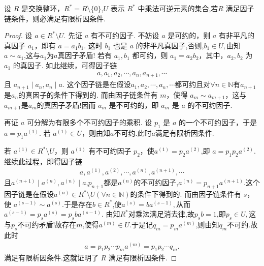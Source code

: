 \documentclass[../../main.tex]{subfiles}%
\begin{document}
\begin{lemma}\label{lemma:抽象代数--引理2.2.3}
设 \( R \) 是交换整环，\( R^* = R \setminus \{0\} \),\( U \) 表示 \( R^* \) 中乘法可逆元素的集合,若\( R \) 满足因子链条件，则必满足有限析因条件.
\end{lemma}
\begin{proof}
设 \( a \in R^* \setminus U \). 先证 \( a \) 有不可约因子. 不妨设 \( a \) 是可约的，则 \( a \) 有非平凡的真因子 \( a_1 \)，即有 \( a = a_1b_1 \). 这时 \( b_1 \) 也是 \( a \) 的非平凡真因子,否则,$b_1\in U,$由知$a\sim a_1$,这与$a_1$为$a$真因子矛盾! 若有 \( a_1, b_1 \) 都可约，则 \( a_1 = a_2b_2 \)，其中，\( a_2, b_2 \) 为 \( a_1 \) 的真因子. 如此继续，可得因子链
\begin{align*}
a, a_1, a_2, \cdots, a_n, a_{n+1}, \cdots
\end{align*}
且 \( a_{n+1} \mid a_n,a_n\mid a\). 
这个因子链是在假设$a_1,a_2,\cdots,a_n,\cdots$都可约且对$\forall n\in \mathbb{N}$有$a_{n+1}$是$a_n$的真因子的条件下得到的.
而由因子链条件有 \( m \)，使得 \( a_m \sim a_{m+1} \)，这与$a_{m+1}$是$a_m$的真因子矛盾!因而 \( a_m \) 是不可约的，即 \( a_m \) 是 \( a \) 的不可约因子.

再证 \( a \) 可分解为有限多个不可约因子的乘积. 设 \( p_1 \) 是 \( a \) 的一个不可约因子，于是 \( a = p_1a^{(1)} \). 若 \( a^{(1)} \in U \)，则由知$a$不可约.此时$a$满足有限析因条件.

若 \( a^{(1)} \in R^* \setminus U \)，则 \( a^{(1)} \) 有不可约因子 \( p_2 \)，使$a^{(1)}=p_2a^{(2)}$,即 \( a = p_1p_2a^{(2)} \). 继续此过程，即得因子链
\begin{align*}
a, a^{(1)}, a^{(2)}, \cdots, a^{(n)}, a^{(n+1)}, \cdots
\end{align*}
且\( a^{(n+1)} \mid a^{(n)},a^{(n)}\mid a\),$p_{n+1}$都是$a^{(n)}$的不可约因子,$a^{(n)}=p_{n+1}a^{(n+1)}$.这个因子链是在假设$a^{(n)}\in R^*\setminus U(\forall n\in \mathbb{N})$的条件下得到的.
而由因子链条件有 \( s \)，使 \( a^{(s-1)} \sim a^{(s)} \).于是存在$b\in R^*$,使$a^{(s)}=ba^{(s-1)},$从而
$a^{\left( s-1 \right)}=p_sa^{\left( s \right)}=p_sba^{\left( s-1 \right)}$.
由知$R^*$对乘法满足消去律,故$p_sb=1$,即$p_s\in U,$这与$p_s$不可约矛盾!故存在$m$,使得$a^{(m)}\in U.$于是记$q_m = p_ma^{(m)}$,则由知$q_m$不可约.故此时
\begin{align*}
a = p_1p_2\cdots p_m a^{(m)}=p_1p_2\cdots q_m.
\end{align*}
满足有限析因条件.这就证明了 \( R \) 满足有限析因条件.
\end{proof}
\end{document}
